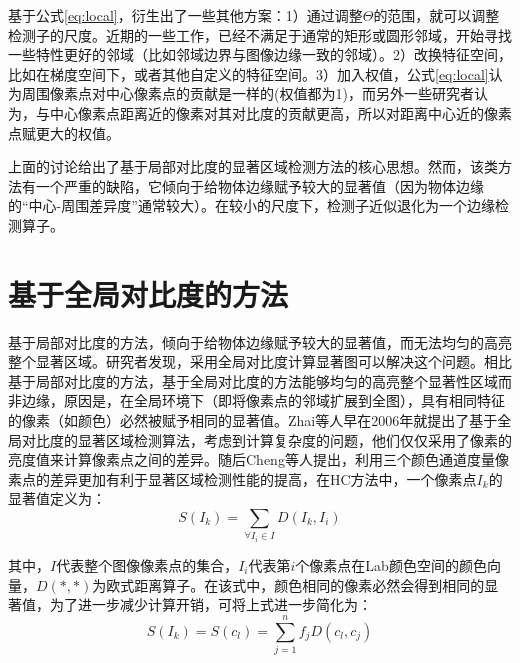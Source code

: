 基于公式\ref{eq:local}，衍生出了一些其他方案：1）通过调整$\Theta$的范围，就可以调整检测子的尺度。近期的一些工作，已经不满足于通常的矩形或圆形邻域，开始寻找一些特性更好的邻域（比如邻域边界与图像边缘一致的邻域）。2）改换特征空间，比如在梯度空间下，或者其他自定义的特征空间。3）加入权值，公式\ref{eq:local}认为周围像素点对中心像素点的贡献是一样的(权值都为1)，而另外一些研究者认为，与中心像素点距离近的像素对其对比度的贡献更高，所以对距离中心近的像素点赋更大的权值。

上面的讨论给出了基于局部对比度的显著区域检测方法的核心思想。然而，该类方法有一个严重的缺陷，它倾向于给物体边缘赋予较大的显著值（因为物体边缘的“中心-周围差异度”通常较大）。在较小的尺度下，检测子近似退化为一个边缘检测算子。

\section{基于全局对比度的方法}
基于局部对比度的方法，倾向于给物体边缘赋予较大的显著值，而无法均匀的高亮整个显著区域。研究者发现，采用全局对比度计算显著图可以解决这个问题。相比基于局部对比度的方法，基于全局对比度的方法能够均匀的高亮整个显著性区域而非边缘，原因是，在全局环境下（即将像素点的邻域扩展到全图），具有相同特征的像素（如颜色）必然被赋予相同的显著值。Zhai\cite{zhai2006visual}等人早在2006年就提出了基于全局对比度的显著区域检测算法，考虑到计算复杂度的问题，他们仅仅采用了像素的亮度值来计算像素点之间的差异。随后Cheng\cite{cheng2011global}等人提出，利用三个颜色通道度量像素点的差异更加有利于显著区域检测性能的提高，在HC方法中，一个像素点$I_k$的显著值定义为：
\begin{equation}
S(I_k)=\sum_{\forall I_i \in I}D(I_k,I_i)
\end{equation}

其中，$I$代表整个图像像素点的集合，$I_i$代表第$i$个像素点在Lab颜色空间的颜色向量，$D(*,*)$为欧式距离算子。在该式中，颜色相同的像素必然会得到相同的显著值，为了进一步减少计算开销，可将上式进一步简化为：
\begin{equation}
S(I_k)=S(c_l)=\sum_{j=1}^n f_j D(c_l,c_j)
\end{equation}

